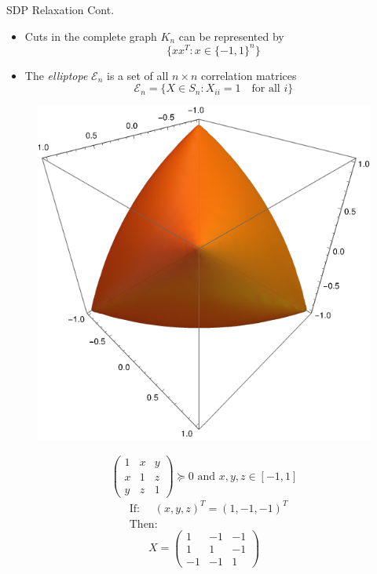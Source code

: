 \documentclass[10pt, xcolor={dvipsnames}]{beamer}
\begin{document}
\begin{frame}{SDP Relaxation Cont.}
\begin{itemize}
\item Cuts in the complete graph $K_n$ can be represented by
$$\lbrace x x^{T} : x \in \lbrace -1, 1 \rbrace^{n} \rbrace$$ 
\item The {\it elliptope} $\mathcal{E}_{n}$ is a set of all $n \times n$ correlation matrices 
\begin{equation}
\mathcal{E}_{n} = \lbrace X \in S_{n} : X_{ii} = 1 \quad \text{for all $i$} \rbrace
\end{equation}
\end{itemize}

\begin{example}[$K_{3}$]
\begin{minipage}[t]{0.5\textwidth}
\begin{figure}
\includegraphics[width=.8\textwidth]{../figures/Elliptope.pdf}
\end{figure}
\end{minipage}
\begin{minipage}[t]{0.5\textwidth}
\vspace{2mm}
$$
\begin{pmatrix}
1 & x & y\\
x & 1 & z\\
y & z & 1
\end{pmatrix} \succeq 0
\text{ and } x,y,z \in [-1, 1]
$$
\begin{align*}
&\text{If: } \quad
(x, y, z)^{T} = (1, -1, -1)^{T} \\
&\text{Then: }
\end{align*}
\vspace{-1cm}
$$
X = \begin{pmatrix}
1 & -1 & -1\\
1 & 1 & -1\\
-1 & -1 & 1
\end{pmatrix}
$$
\end{minipage}
\end{example}
\end{frame}
\end{document}

